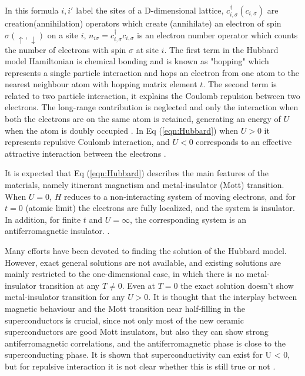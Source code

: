 In this formula $i,i'$ label the sites of a D-dimensional lattice, $c_{i,\sigma}^{\dagger}(c_{i,\sigma})$ are creation(annihilation) operators which create (annihilate) an electron of spin $\sigma(\uparrow,\downarrow)$ on a site $i$, $n_{i\sigma}=c_{i,\sigma}^{\dagger}c_{i,\sigma}$ is an electron number operator which counts the number of electrons with spin $\sigma$ at site $i$. The first term in the Hubbard model Hamiltonian is chemical bonding and is known as "hopping" which represents a single particle interaction and hops an electron from one atom to the nearest neighbour atom with hopping matrix element $t$. The second term is related to two particle interaction, it explains the Coulomb repulsion between two electrons. The long-range contribution is neglected and only the interaction when both the electrons are on the same atom is retained, generating an energy of $U$ when the atom is doubly occupied \cite{Mario}. In Eq (\ref{eqn:Hubbard}) when $U>0$ it represents repulsive Coulomb interaction, and $U<0$ corresponds to an effective attractive interaction  between the electrons \cite{Monto}.

It is expected that Eq (\ref{eqn:Hubbard}) describes the main features of the materials, namely itinerant magnetism and metal-insulator (Mott) transition. When $U= 0$, $H$ reduces to a non-interacting system of moving electrons, and for $t= 0$ (atomic limit) the electrons are fully localized, and the system is insulator. In addition, for finite $t$ and $U =\infty$, the corresponding system is an antiferromagnetic insulator. \cite{Monto}.

Many efforts have been devoted to finding the solution of the Hubbard model. However, exact general solutions are not available, and existing solutions are mainly restricted to the one-dimensional case, in which there is no metal-insulator transition at any $T\neq0$. Even at $T = 0$ the exact solution doesn't show metal-insulator transition
for any $U > 0$. It is thought that the interplay between magnetic behaviour and the Mott transition near half-filling in the superconductors is crucial, since not only most of the new ceramic superconductors are good Mott insulators, but also they can show strong antiferromagnetic correlations, and the antiferromagnetic phase is close to the superconducting phase. It is shown that superconductivity can exist for U < 0, but for repulsive interaction it is not clear whether this is still true or not \cite{Monto}.

